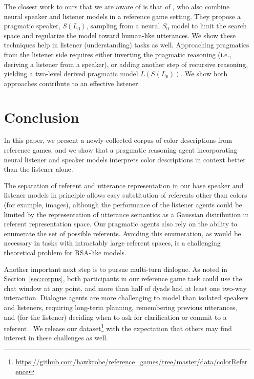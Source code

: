 \documentclass[11pt,letterpaper]{article}
\newcommand{\Listener}{L}
\newcommand{\Speaker}{S}
\renewcommand{\|}{\mid}
\newcommand{\secref}[1]{Section~\ref{#1}}
\begin{document}
The closest work to ours that we are aware of is that of
, who also combine neural speaker
and listener models in a reference game setting. They propose a
pragmatic speaker, $\Speaker(\Listener_0)$, sampling from a neural
$\Speaker_0$ model to limit the search space and regularize the model toward
human-like utterances. We show these techniques help in
listener (understanding) tasks as well. Approaching pragmatics from the listener
side requires either inverting the pragmatic reasoning (i.e., deriving a
listener from a speaker), or adding another step of recursive reasoning,
yielding a two-level derived pragmatic model
$\Listener(\Speaker(\Listener_0))$. We show both approaches contribute
to an effective listener.

\section{Conclusion} \label{sec:conclusion}

In this paper, we present a newly-collected corpus of color descriptions from
reference games, and we show that a pragmatic reasoning agent
incorporating neural listener and speaker models
interprets color descriptions in context better than the listener alone.


The separation of referent and utterance representation in our base speaker and
listener models in principle allows easy substitution of referents other than colors
(for example, images), although the performance of the listener agents could be
limited by the representation of utterance semantics as a Gaussian distribution in
referent representation space. Our pragmatic agents also rely on the ability to 
enumerate the set of possible referents. Avoiding this enumeration, as would be 
necessary in tasks with intractably large referent spaces, is a challenging 
theoretical problem for RSA-like models.

Another important next step is to pursue
multi-turn dialogue. As noted in \secref{sec:corpus},
both participants in our reference game task could use the chat window
at any point, and more than half of dyads
had at least one two-way interaction. Dialogue agents are more
challenging to model than isolated speakers and listeners,
requiring long-term planning, remembering previous utterances, and
(for the listener) deciding when to ask for clarification or commit to a referent
\cite{Lewis79_Scorekeeping,BrownYule83_Discourse,Clark96,Roberts96_InformationStructureDiscourse}.
We release our
dataset\footnote{\label{foot:release}\url{https://github.com/hawkrobe/reference_games/tree/master/data/colorReference}}
with the expectation that others may find interest in these challenges as well.
\end{document}
